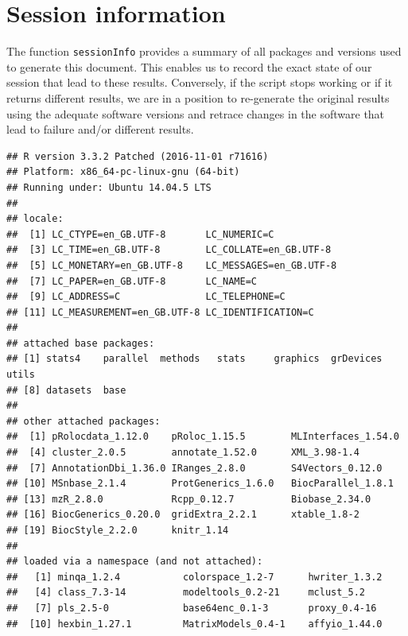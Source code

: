 \section*{Session information}

The function \texttt{sessionInfo} provides a summary of all packages
and versions used to generate this document. This enables us to record
the exact state of our session that lead to these results. Conversely,
if the script stops working or if it returns different results, we are
in a position to re-generate the original results using the adequate
software versions and retrace changes in the software that lead to
failure and/or different results.

\begin{knitrout}
\color{fgcolor}\begin{kframe}
\begin{alltt}
\hlstd{()}
\end{alltt}
\begin{verbatim}
## R version 3.3.2 Patched (2016-11-01 r71616)
## Platform: x86_64-pc-linux-gnu (64-bit)
## Running under: Ubuntu 14.04.5 LTS
## 
## locale:
##  [1] LC_CTYPE=en_GB.UTF-8       LC_NUMERIC=C              
##  [3] LC_TIME=en_GB.UTF-8        LC_COLLATE=en_GB.UTF-8    
##  [5] LC_MONETARY=en_GB.UTF-8    LC_MESSAGES=en_GB.UTF-8   
##  [7] LC_PAPER=en_GB.UTF-8       LC_NAME=C                 
##  [9] LC_ADDRESS=C               LC_TELEPHONE=C            
## [11] LC_MEASUREMENT=en_GB.UTF-8 LC_IDENTIFICATION=C       
## 
## attached base packages:
## [1] stats4    parallel  methods   stats     graphics  grDevices utils    
## [8] datasets  base     
## 
## other attached packages:
##  [1] pRolocdata_1.12.0    pRoloc_1.15.5        MLInterfaces_1.54.0 
##  [4] cluster_2.0.5        annotate_1.52.0      XML_3.98-1.4        
##  [7] AnnotationDbi_1.36.0 IRanges_2.8.0        S4Vectors_0.12.0    
## [10] MSnbase_2.1.4        ProtGenerics_1.6.0   BiocParallel_1.8.1  
## [13] mzR_2.8.0            Rcpp_0.12.7          Biobase_2.34.0      
## [16] BiocGenerics_0.20.0  gridExtra_2.2.1      xtable_1.8-2        
## [19] BiocStyle_2.2.0      knitr_1.14          
## 
## loaded via a namespace (and not attached):
##   [1] minqa_1.2.4           colorspace_1.2-7      hwriter_1.3.2        
##   [4] class_7.3-14          modeltools_0.2-21     mclust_5.2           
##   [7] pls_2.5-0             base64enc_0.1-3       proxy_0.4-16         
##  [10] hexbin_1.27.1         MatrixModels_0.4-1    affyio_1.44.0        

\end{verbatim}
\end{kframe}
\end{knitrout}
